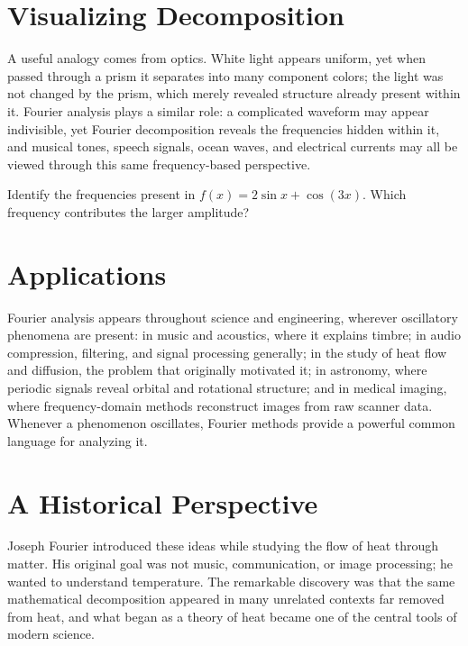 \section{Visualizing Decomposition}

A useful analogy comes from optics. White light appears uniform, yet
when passed through a prism it separates into many component colors; the
light was not changed by the prism, which merely revealed structure
already present within it. Fourier analysis plays a similar role: a
complicated waveform may appear indivisible, yet Fourier decomposition
reveals the frequencies hidden within it, and musical tones, speech
signals, ocean waves, and electrical currents may all be viewed through
this same frequency-based perspective.

\begin{practicenow}
Identify the frequencies present in $f(x) = 2\sin x + \cos(3x)$. Which
frequency contributes the larger amplitude?
\end{practicenow}

\section{Applications}

Fourier analysis appears throughout science and engineering, wherever
oscillatory phenomena are present: in music and acoustics, where it
explains timbre; in audio compression, filtering, and signal processing
generally; in the study of heat flow and diffusion, the problem that
originally motivated it; in astronomy, where periodic signals reveal
orbital and rotational structure; and in medical imaging, where
frequency-domain methods reconstruct images from raw scanner data.
Whenever a phenomenon oscillates, Fourier methods provide a powerful
common language for analyzing it.

\section{A Historical Perspective}

Joseph Fourier introduced these ideas while studying the flow of heat
through matter. His original goal was not music, communication, or image
processing; he wanted to understand temperature. The remarkable
discovery was that the same mathematical decomposition appeared in many
unrelated contexts far removed from heat, and what began as a theory of
heat became one of the central tools of modern science.

